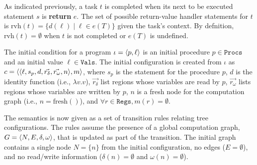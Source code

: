 As indicated previously, a task $t$ is completed when its next to be executed statement $s$ is \textbf{return} $e$. The set of possible return-value handler statements for $t$ is $\mathrm{rvh}(t) = \{d(\ell) \mid \ell \in e(T)\}$ given the task's context. By defnition, $\mathrm{rvh}(t) = \emptyset$ when $t$ is not completed or $e(T)$ is undefined. 

The initial condition for a program $\iota = \langle p, \ell \rangle $ is an initial procedure $p \in \texttt{Procs}$ and an initial value $\ell \in \texttt{Vals}$. The initial configuration is created from $\iota$ as $c = \langle \langle \ell, s_p, d, \vec{r_\delta}, \vec{r_\omega}, n \rangle , m \rangle $, where $s_p$ is the statement for the procedure $p$, $d$ is the identity function (i.e., $\lambda v.v$), $\vec{r_\delta}$ list regions whose variables are read by $p$, $\vec{r_\omega}$ lists regions whose variables are written by $p$, $n$ is a fresh node for the computation graph (i.e., $n = \mathrm{fresh}()$), and $\forall r \in \texttt{Regs}, m(r) = \emptyset$.

The semantics is now given as a set of transition rules relating tree configurations. The rules assume the presence of a global computation graph, $G = \langle N, E, \delta, \omega \rangle $, that is updated as part of the transition. The initial graph contains a single node $N = \{n\}$ from the initial configuration, no edges ($E = \emptyset$), and no read/write information ($\delta(n) = \emptyset$ and $\omega(n) = \emptyset$).

